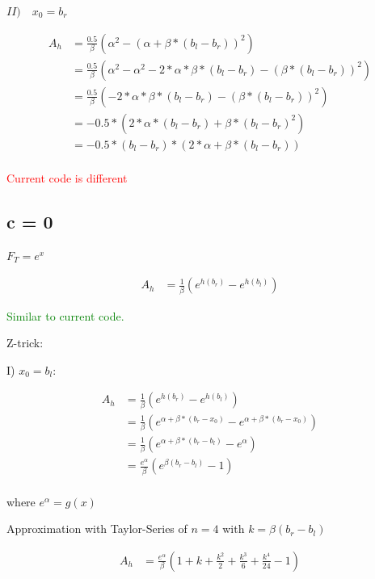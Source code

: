 \documentclass[]{article}
\begin{document}
\textbf{$II) \quad x_0 = b_r$}

\begin{align*}
A_h &= \frac{0.5}{\beta} \left( \alpha^2 - (\alpha + \beta * (b_l - b_r))^2 \right) \\
&= \frac{0.5}{\beta} \left( \alpha^2 - \alpha^2 - 2 * \alpha * \beta * (b_l - b_r) - (\beta * (b_l - b_r))^2   \right) \\
&= \frac{0.5}{\beta} \left( - 2 * \alpha * \beta * (b_l - b_r) - (\beta * (b_l - b_r))^2 \right) \\
&= -0.5 * \left( 2 * \alpha * (b_l - b_r) + \beta * (b_l - b_r)^2 \right) \\
&= -0.5 * (b_l - b_r) * \left( 2 * \alpha  + \beta * (b_l - b_r) \right) \\
\end{align*}

\textcolor{red}{Current code is different}

\subsection{c = 0}

$F_T = e^x$

\begin{align*}
A_h &= \frac{1}{\beta} \left( e^{h(b_r)} - e^{h(b_l)} \right)
\end{align*}

\textcolor{green}{Similar to current code.}

Z-trick:

I) $x_0 = b_l$:

\begin{align*}
A_h &= \frac{1}{\beta} \left( e^{h(b_r)} - e^{h(b_l)} \right) \\
&= \frac{1}{\beta} \left( e^{\alpha + \beta * (b_r - x_0)} - e^{\alpha + \beta * (b_r - x_0)} \right) \\
&= \frac{1}{\beta} \left( e^{\alpha + \beta * (b_r - b_l)} - e^{\alpha} \right) \\
&=\frac{e^{\alpha}}{\beta} \left( e^{\beta (b_r - b_l)} - 1 \right) \\
\end{align*}

where $e^{\alpha} = g(x)$

Approximation with Taylor-Series of $n = 4$ with $k = \beta (b_r - b_l)$

\begin{align*}
A_h &= \frac{e^{\alpha}}{\beta} \left(1 + k + \frac{k^2}{2} +  \frac{k^3}{6} + \frac{k^4}{24} - 1 \right)
\end{align*}
\end{document}
